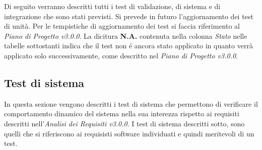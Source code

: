 Di seguito verranno descritti tutti i test di validazione, di sistema e di integrazione che sono stati previsti. Si prevede in futuro l'aggiornamento dei test di unità. Per le tempistiche di aggiornamento dei test si faccia riferimento al \textit{Piano di Progetto v3.0.0}. La dicitura \textbf{N.A.} contenuta nella colonna \textit{Stato} nelle tabelle sottostanti indica che il test non é ancora stato applicato in quanto verrà applicato solo successivamente, come descritto nel \textit{Piano di Progetto v3.0.0}.


\subsection{Test di sistema}
In questa sezione vengono descritti i test di sistema che permettono di verificare il comportamento dinamico del sistema nella sua interezza rispetto ai requisiti descritti nell'\textit{Analisi dei Requisiti v3.0.0}.
I test di sistema descritti sotto, sono quelli che si riferiscono ai requisisti software individuati e quindi meritevoli di un test.

